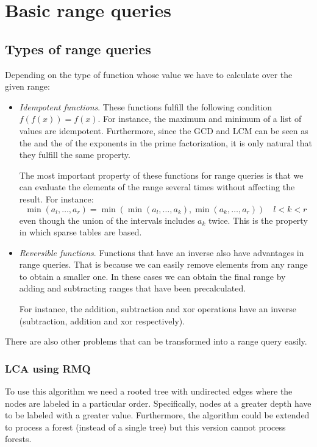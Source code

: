 
\chapter{Basic range queries }

\section{Types of range queries}
Depending on the type of function whose value we have to calculate over
the given range:
\begin{itemize}
		\item \textit{Idempotent functions}. These functions fulfill the 
				following condition $f(f(x))=f(x)$. For instance, the maximum
				and minimum of a list of values are idempotent. 
				Furthermore, since the GCD and LCM can be seen as 
				the  and the  of the exponents in the
				prime factorization, it is only natural that they fulfill the same 
				property.

				The most important property of these functions for range queries
				is that we can evaluate the elements of the range several times 
				without affecting the result. For instance:
				\[
						\min(a_l,\dots ,a_r)= \min \left (
								\min (a_l, \dots,  a_k), \min (a_{k},\dots, a_r)
						\right ) \quad l < k <r
				\]
				even though the union of the intervals includes $a_k$ twice.
				This is the property in which sparse tables are based.


		\item  \textit{Reversible functions}. Functions that have an inverse
				also have advantages in range queries. That is because we
				can easily remove elements from any range to obtain a smaller
				one. In these cases we can obtain the final range by adding
				and subtracting ranges that have been precalculated.

				For instance, the addition, subtraction and xor operations have 
				an inverse (subtraction, addition and xor respectively). 

\end{itemize}

\newpage
There are also other problems that can be transformed into a range query easily.

\subsection{LCA using RMQ}
To use this algorithm we need a rooted tree with undirected edges where the 
nodes are labeled in a particular order. Specifically, nodes at a greater
depth have to be labeled with a greater value. Furthermore, the algorithm
could be extended to process a forest (instead of a single tree) but 
this version cannot process forests.

